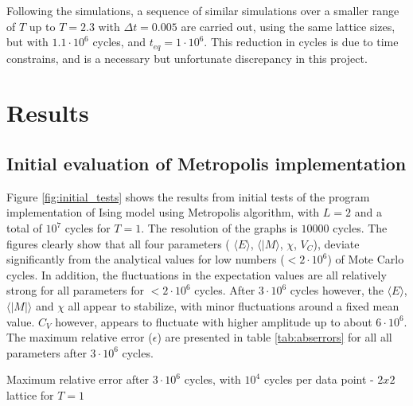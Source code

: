 \documentclass[%
oneside,                 %
final,                   %
10pt]{article}
\begin{document}
Following the simulations, a sequence of similar simulations over a smaller range of $T$ up to $T=2.3$ with $\Delta t=0.005$ are carried out, using the same lattice sizes, but with $1.1 \cdot 10^6$ cycles, and $t_{eq}=1 \cdot 10^6$. This reduction in cycles is due to time constrains, and is a necessary but unfortunate discrepancy in this project. 


\section{Results}
\subsection{Initial evaluation of Metropolis implementation}
\label{SS:R.initialeval}
Figure \ref{fig:initial_tests} shows the results from initial tests of the program implementation of Ising model using Metropolis algorithm, with $L=2$ and a total of $10^7$ cycles for $T=1$. The resolution of the graphs is $10000$ cycles. The figures clearly show that all four parameters ( $\langle E \rangle$, $\langle | M \rangle$, $\chi$, $V_C$), deviate significantly from the analytical values for low numbers ($<2 \cdot 10^6 $) of Mote Carlo cycles. In addition, the fluctuations in the expectation values are all relatively strong for all parameters for $<2 \cdot 10^6 $ cycles. After $3 \cdot 10^6$ cycles however, the $\langle E\rangle$, $\langle |M| \rangle$ and $\chi$ all appear to stabilize, with minor fluctuations around a fixed mean value. $C_V$ however, appears to fluctuate with higher amplitude up to about $6 \cdot 10^6$. The maximum relative error ($\epsilon$) are presented in table  \ref{tab:abserrors} for all all parameters after $3 \cdot 10^6$ cycles.


\begin{table}[h!tb]
    \centering
    \caption{Maximum relative error after $3 \cdot 10^6$ cycles, with $10^4$ cycles per data point - $2x2$ lattice for $T=1$}
\label{tab:abserrors}
\end{table}
\end{document}

